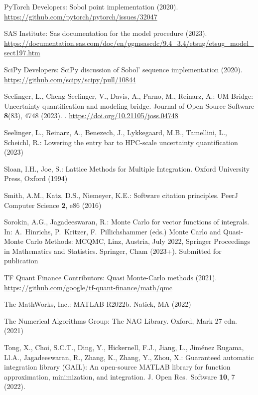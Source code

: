 \documentclass[graybox]{svmult}
\begin{document}
\begin{thebibliography}{10}
	{PyTorch Developers}: {S}obol point implementation (2020).
	\newblock \urlprefix\url{https://github.com/pytorch/pytorch/issues/32047}

	{SAS Institute}: Sas documentation for the model procedure (2023).
	\newblock
	\urlprefix\url{https://documentation.sas.com/doc/en/pgmsascdc/9.4_3.4/etsug/etsug_model_sect197.htm}

	{SciPy Developers}: {SciPy} discussion of {S}obol' sequence implementation
	(2020).
	\newblock \urlprefix\url{https://github.com/scipy/scipy/pull/10844}

	Seelinger, L., Cheng-Seelinger, V., Davis, A., Parno, M., Reinarz, A.:
	{UM-Bridge}: {U}ncertainty quantification and modeling bridge.
	\newblock Journal of Open Source Software \textbf{8}(83), 4748 (2023).
	\newblock {}.
	\newblock \urlprefix\url{https://doi.org/10.21105/joss.04748}

	Seelinger, L., Reinarz, A., Benezech, J., Lykkegaard, M.B., Tamellini, L.,
	Scheichl, R.: Lowering the entry bar to {HPC}-scale uncertainty
	quantification (2023)

	Sloan, I.H., Joe, S.: Lattice Methods for Multiple Integration.
	\newblock Oxford University Press, Oxford (1994)

	Smith, A.M., Katz, D.S., Niemeyer, K.E.: Software citation principles.
	\newblock PeerJ Computer Science \textbf{2}, e86 (2016)

	Sorokin, A.G., Jagadeeswaran, R.: Monte {C}arlo for vector functions of
	integrals.
	\newblock In: A.~Hinrichs, P.~Kritzer, F.~Pillichshammer (eds.) {M}onte {C}arlo
	and Quasi-{M}onte {C}arlo Methods: {MCQMC}, {L}inz, Austria, {J}uly 2022,
	Springer Proceedings in Mathematics and Statistics. Springer, Cham (2023+).
	\newblock Submitted for publication

	{TF Quant Finance Contributors}: Quasi {M}onte-{C}arlo methods (2021).
	\newblock \urlprefix\url{https://github.com/google/tf-quant-finance/math/qmc}

	{The MathWorks, Inc.}: {MATLAB} R2022b.
	\newblock Natick, MA (2022)

	{The Numerical Algorithms Group}: The {NAG} Library.
	\newblock Oxford, {M}ark 27 edn. (2021)

	Tong, X., Choi, S.C.T., Ding, Y., Hickernell, F.J., Jiang, L., {Jim\'enez
		Rugama}, {\relax Ll}.A., Jagadeeswaran, R., Zhang, K., Zhang, Y., Zhou, X.:
	Guaranteed automatic integration library {(GAIL)}: An open-source {MATLAB}
	library for function approximation, minimization, and integration.
	\newblock J. Open Res.\ Software \textbf{10}, 7 (2022).
	\newblock {}


\end{thebibliography}
\end{document}
